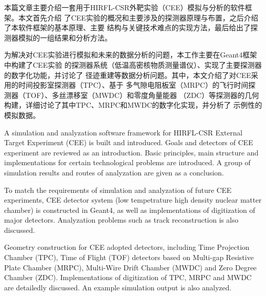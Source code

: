 
\begin{cabstract}
本篇文章主要介绍一套用于HIRFL-CSR外靶实验（CEE）模拟与分析的软件框架。本文首先介绍
了CEE实验的概况和主要涉及的探测器原理与布置，之后介绍了本软件框架的基本原理、主要
结构与关键技术难点的实现方法，最后给出了探测器模拟的一组结果和分析方法。

为解决对CEE实验进行模拟和未来的数据分析的问题，本工作主要在Geant4框架中构建了CEE实验
的探测器系统（低温高密核物质测量谱仪）、实现了主要探测器的数字化功能，并讨论了
径迹重建等数据分析问题。其中，本文介绍了对CEE采用的时间投影室探测器（TPC）、基于
多气隙电阻板室（MRPC）的飞行时间探测器（TOF）、多丝漂移室（MWDC）和零度角量能器
（ZDC）等探测器的几何构建，详细讨论了其中TPC、MRPC和MWDC的数字化实现，并分析了
示例性的模拟数据。

\end{cabstract}

\begin{eabstract}
A simulation and analyzation software framework for HIRFL-CSR External Target
Experiment (CEE) is built and introduced. Goals and detectors of CEE experiment are
reviewed as an introduction. Basic principles, main structure and implementations
for certain technological problems are introduced. A group of simulation results and
routes of analyzation are given as a conclusion.

To match the requirements of simulation and analyzation of future CEE experiments,
CEE detector system (low tempetrature high density nuclear matter chamber) is
constructed in Geant4, as well as implementations of digitization of major detectors.
Analyzation problems such as track reconstruction is also discussed. 

Geometry construction for CEE adopted detectors, including Time Projection Chamber
(TPC), Time of Flight (TOF) detectors based on Multi-gap Resistive Plate Chamber
(MRPC), Multi-Wire Drift Chamber (MWDC) and Zero Degree Chamber (ZDC).
Implementations of digitization of TPC, MRPC and MWDC are detailedly discussed.
An example simulation output is also analyzed.
\end{eabstract}
